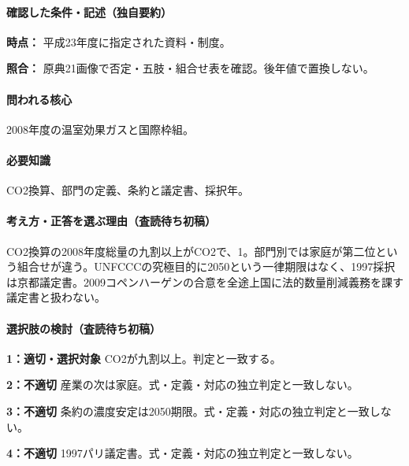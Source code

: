 \paragraph{確認した条件・記述（独自要約）}\mbox{}\par

\noindent\textbf{時点：} 平成23年度に指定された資料・制度。\par

\noindent\textbf{照合：} 原典21画像で否定・五肢・組合せ表を確認。後年値で置換しない。\par

\paragraph{問われる核心} 2008年度の温室効果ガスと国際枠組。

\paragraph{必要知識} CO2換算、部門の定義、条約と議定書、採択年。

\paragraph{考え方・正答を選ぶ理由（査読待ち初稿）} CO2換算の2008年度総量の九割以上がCO2で、1。部門別では家庭が第二位という組合せが違う。UNFCCCの究極目的に2050という一律期限はなく、1997採択は京都議定書。2009コペンハーゲンの合意を全途上国に法的数量削減義務を課す議定書と扱わない。

\paragraph{選択肢の検討（査読待ち初稿）}\mbox{}\par

\noindent\textbf{1：適切・選択対象} CO2が九割以上。判定と一致する。\par

\noindent\textbf{2：不適切} 産業の次は家庭。式・定義・対応の独立判定と一致しない。\par

\noindent\textbf{3：不適切} 条約の濃度安定は2050期限。式・定義・対応の独立判定と一致しない。\par

\noindent\textbf{4：不適切} 1997パリ議定書。式・定義・対応の独立判定と一致しない。\par

